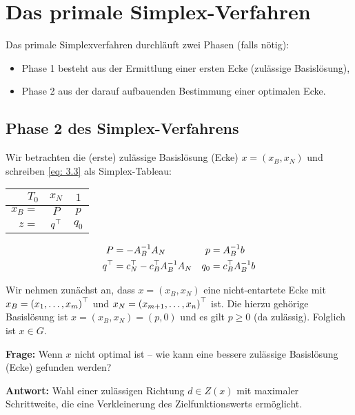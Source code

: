 \section{Das primale Simplex-Verfahren}

Das primale Simplexverfahren durchläuft zwei Phasen (falls nötig):
\begin{itemize}
	\item Phase 1 besteht aus der Ermittlung einer ersten Ecke (zulässige Basislösung), 
	\item Phase 2 aus der darauf aufbauenden Bestimmung einer optimalen Ecke.
\end{itemize} 

\subsection{Phase 2 des Simplex-Verfahrens}

Wir betrachten die (erste) zulässige Basislösung (Ecke) $x = (x_B, x_N)$ und schreiben \eqref{eq: 3.3} als Simplex-Tableau:

\begin{center}
	\begin{tabular}{r|c|c}
		$T_0$ & $x_N$ & $1$ \\ \hline
		$x_B = $ & $P$ & $p$ \\ \hline
		$z =$ & $q^{\top}$ & $q_0$
	\end{tabular}
\end{center}

\begin{equation*}
	\begin{aligned}
		P &= -A_B^{-1} A_N  &
		p &= A_B^{-1} b \\
		q^{\top} &= c_N^{\top} - c_B^{\top} A_B^{-1} A_N &
		q_0 &= c_B^{\top} A_B^{-1} b 
	\end{aligned}
	\label{eq: 3.5}	
\end{equation*}


Wir nehmen zunächst an, dass $x = (x_B, x_N)$ eine nicht-entartete Ecke mit $x_B = \left( x_1, \dots, x_m \right)^{\top}$ und $x_N = \left( x_{m+1}, \dots, x_n \right)^{\top}$ ist. Die hierzu gehörige Basislösung ist $x = (x_B, x_N) = (p,0)$ und es gilt $p \ge 0$ (da zulässig). Folglich ist $x \in G$.

\textbf{Frage:} Wenn $x$ nicht optimal ist -- wie kann eine bessere zulässige Basislösung (Ecke) gefunden werden?

\textbf{Antwort:} Wahl einer zulässigen Richtung $d \in Z(x)$ mit maximaler Schrittweite, die eine Verkleinerung des Zielfunktionswerts ermöglicht.

